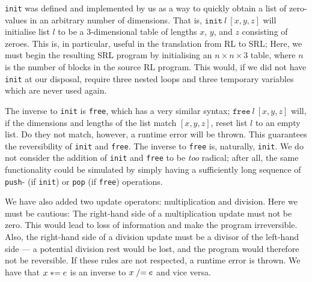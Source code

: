 \texttt{init} was defined and implemented by us as a way to quickly obtain a list of zero-values in an arbitrary number of dimensions. That is, $\texttt{init} \ l \ [x,y,z]$ will initialise list $l$ to be a 3-dimensional table of lengths $x$, $y$, and $z$ consisting of zeroes. This is, in particular, useful in the translation from RL to SRL; Here, we must begin the resulting SRL program by initialising an $n \times n \times 3$ table, where $n$ is the number of blocks in the source RL program. This would, if we did not have \texttt{init} at our disposal, require three nested loops and three temporary variables which are never used again.

The inverse to \texttt{init} is \texttt{free}, which has a very similar syntax; $\texttt{free} \ l \ [x,y,z]$ will, if the dimensions and lengths of the list match $[x,y,z]$, reset list $l$ to an empty list. Do they not match, however, a runtime error will be thrown. This guarantees the reversibility of \texttt{init} and \texttt{free}. The inverse to \texttt{free} is, naturally, \texttt{init}.
We do not consider the addition of \texttt{init} and \texttt{free} to be \textit{too} radical; after all, the same functionality could be simulated by simply having a sufficiently long sequence of \texttt{push}- (if \texttt{init}) or \texttt{pop} (if \texttt{free}) operations.

We have also added two update operators: multiplication and division. Here we must be cautious: The right-hand side of a multiplication update must not be zero. This would lead to loss of information and make the program irreversible. Also, the right-hand side of a division update must be a divisor of the left-hand side --- a potential division rest would be lost, and the program would therefore not be reversible. If these rules are not respected, a runtime error is thrown. We have that $x \mathrel{*}= e$ is an inverse to $x \mathrel{/}= e$ and vice versa.

